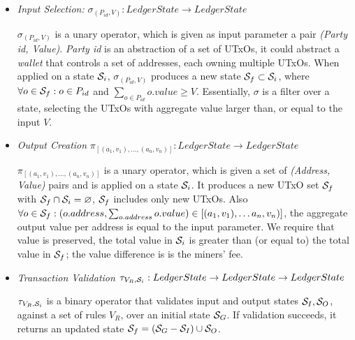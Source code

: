 \begin{itemize}
    \item \emph{Input Selection:}
        $\sigma_{(P_{id},V)} : LedgerState \rightarrow	LedgerState$

        $\sigma_{(P_{id},V)}$ is a unary operator, which is given as input
        parameter a pair \emph{(Party id, Value)}. \emph{Party id} is an
        abstraction of a set of UTxOs, \eg
        it could abstract a \emph{wallet} that controls a set of addresses,
        each owning multiple UTxOs.
        When applied on a state $\mathcal{S}_i$, $\sigma_{(P_{id},V)}$
        produces a new state $\mathcal{S}_f \subset \mathcal{S}_i$, where
        $\forall o \in \mathcal{S}_f: o \in P_{id}$ and $\sum_{o \in
        P_{id}}^{}o.value \geq V$. Essentially, $\sigma$ is a filter over a
        state, selecting the UTxOs with aggregate value larger than, or equal
        to the input
        $V$.

    \item \emph{Output Creation}
        $\pi_{[(a_1,v_1), \dots,(a_n,v_n)]} : LedgerState \rightarrow LedgerState$

        $\pi_{[(a_1,v_1), \dots,(a_n,v_n)]}$ is a unary operator, which is
        given a set of \emph{(Address, Value)} pairs and is applied on a state
        $\mathcal{S}_i$. It produces a new UTxO set $\mathcal{S}_f$ with
        $\mathcal{S}_f \cap \mathcal{S}_i = \varnothing$, \ie
        $\mathcal{S}_f$ includes only new UTxOs. Also $\forall o \in
        \mathcal{S}_f: (o.address, \sum_{o.address}^{}o.value) \in [(a_1,v_1),
        \dots a_n,v_n)]$, \ie the aggregate output value per address is equal
        to the input parameter. We require that value is preserved, \ie the
        total value in $\mathcal{S}_i$ is greater than (or equal to) the total
        value in $\mathcal{S}_f$; the value difference is is the miners' fee.

    \item \emph{Transaction Validation}
        $\tau_{V_R, \mathcal{S}_i} : LedgerState \rightarrow LedgerState \rightarrow LedgerState$

        $\tau_{V_R,\mathcal{S}_i}$ is a binary operator that validates input
        and output states $\mathcal{S}_I, \mathcal{S}_O$, against a set of
        rules $V_R$, over an initial state $\mathcal{S}_G$. If validation
        succeeds, it returns an updated state $\mathcal{S}_f = (\mathcal{S}_G
        - \mathcal{S}_I) \cup \mathcal{S}_O$.
\end{itemize}

